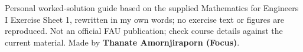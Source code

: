 \documentclass[11pt]{article}
\begin{document}
\begin{keepsection}
\end{keepsection}

\vfill{\small Personal worked-solution guide based on the supplied Mathematics for Engineers I Exercise Sheet 1, rewritten in my own words; no exercise text or figures are reproduced. Not an official FAU publication; check course details against the current material. Made by \textbf{Thanate Amornjiraporn (Focus)}.}
\end{document}
